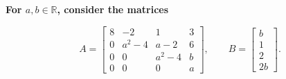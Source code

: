 \providecommand{\rank}{\operatorname{r}}
\providecommand{\RR}{\mathbb R}
\providecommand{\CC}{\mathbb C}
\providecommand{\KK}{\mathbb K}

\setcounter{enumi}{38}
\item {\bfseries\boldmath
For $a,b\in\RR$, consider the matrices
}

\[
A=\begin{bmatrix}8&-2&1&3\\0&a^2-4&a-2&6\\0&0&a^2-4&b\\0&0&0&a\end{bmatrix},\qquad B=\begin{bmatrix}b\\1\\2\\2b\end{bmatrix}.
\]

